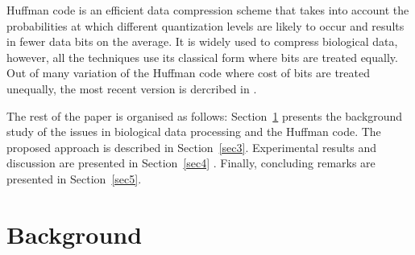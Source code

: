 \documentclass[preprint,12pt]{elsarticle}
\begin{document}
Huffman code is an efficient data compression scheme that takes into account the probabilities at which different quantization levels are likely to occur and
results in fewer data bits on the average. It is widely used to compress biological data, however, all the techniques use its classical form where bits are treated equally. Out of many variation of the Huffman code where cost of bits are treated unequally, the most recent version is dercribed in \cite{Kab14}.

The rest of the paper is organised as follows: Section~\ref{sec2} presents the background study of the issues in biological data processing and the Huffman code. The proposed approach is described in Section~\ref{sec3}. Experimental results and discussion are presented in Section~\ref{sec4} . Finally, concluding remarks are presented in Section~\ref{sec5}. 
\label{sec1}

\section{Background}
\label{sec2}
\end{document}
